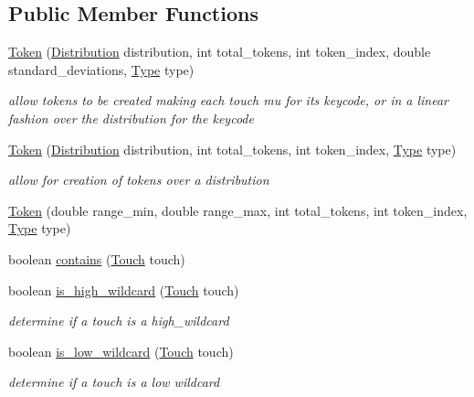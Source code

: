 \subsection*{Public Member Functions}
\begin{DoxyCompactItemize}
\item 
\hyperlink{classcomponents_1_1_token_a73f5eb6dda64ee3049237ca34f28a73c}{Token} (\hyperlink{classcomponents_1_1_distribution}{Distribution} distribution, int total\+\_\+tokens, int token\+\_\+index, double standard\+\_\+deviations, \hyperlink{enumcomponents_1_1_token_1_1_type}{Type} type)
\begin{DoxyCompactList}\small\item\em allow tokens to be created making each touch mu for its keycode, or in a linear fashion over the distribution for the keycode \end{DoxyCompactList}\item 
\hyperlink{classcomponents_1_1_token_aaecd79f21bdfa6dd838719b4cf736df0}{Token} (\hyperlink{classcomponents_1_1_distribution}{Distribution} distribution, int total\+\_\+tokens, int token\+\_\+index, \hyperlink{enumcomponents_1_1_token_1_1_type}{Type} type)
\begin{DoxyCompactList}\small\item\em allow for creation of tokens over a distribution \end{DoxyCompactList}\item 
\hyperlink{classcomponents_1_1_token_aec989a1d1fd6f860a84839091bf0586a}{Token} (double range\+\_\+min, double range\+\_\+max, int total\+\_\+tokens, int token\+\_\+index, \hyperlink{enumcomponents_1_1_token_1_1_type}{Type} type)
\item 
boolean \hyperlink{classcomponents_1_1_token_af023f6e27fd68da7705603161ccffe36}{contains} (\hyperlink{classcomponents_1_1_touch}{Touch} touch)
\item 
boolean \hyperlink{classcomponents_1_1_token_a3e7b6d12602ff4da363a96701e2a365f}{is\+\_\+high\+\_\+wildcard} (\hyperlink{classcomponents_1_1_touch}{Touch} touch)
\begin{DoxyCompactList}\small\item\em determine if a touch is a high\+\_\+wildcard \end{DoxyCompactList}\item 
boolean \hyperlink{classcomponents_1_1_token_a5e1eeb68449d6a940302f6b2561c6cec}{is\+\_\+low\+\_\+wildcard} (\hyperlink{classcomponents_1_1_touch}{Touch} touch)
\begin{DoxyCompactList}\small\item\em determine if a touch is a low wildcard \end{DoxyCompactList}\item 

\end{DoxyCompactItemize}
